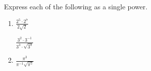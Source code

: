 Express each of the following as a single power.  

\begin{enumerate}[ref={\fcProblemRef}]
\item   $\displaystyle\frac{2^5\cdot 2^7}{2\sqrt{2}}$

  $\label{problemSimplify3^23^(-1)/(3^3sqrt(3^3))} \displaystyle\frac{3^2\cdot 3^{-1}}{3^3\cdot \sqrt{3^3}}$

\item   $\displaystyle \frac{\pi^3}{\pi^{-1}\sqrt{\pi^5}}$

\end{enumerate}
